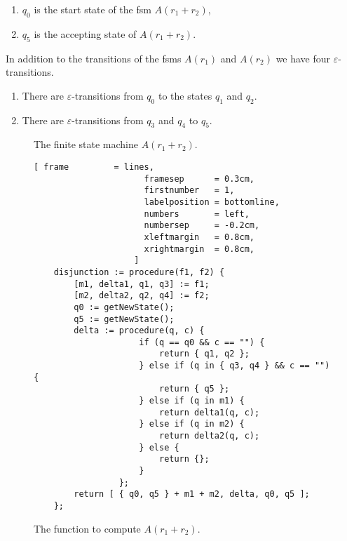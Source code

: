 \begin{enumerate}
\begin{enumerate}
      \item $q_0$ is the start state of the fsm $A(r_1 + r_2)$,
      \item $q_5$ is the accepting state of $A(r_1 + r_2)$.
      \end{enumerate}
      In addition to the transitions of the fsms  $A(r_1)$ and $A(r_2)$ we have four $\varepsilon$-transitions.
      \begin{enumerate}
      \item There are $\varepsilon$-transitions from $q_0$ to the states $q_1$ and $q_2$.
      \item There are $\varepsilon$-transitions from  $q_3$ and $q_4$ to $q_5$.
      \end{enumerate}
                   
      \begin{figure}[!ht]
        \centering
      \caption{The finite state machine $A(r_1 + r_2)$.}
      \label{fig:aPlus.eps}
      \end{figure}

    \begin{figure}[!ht]
    \centering
    \begin{Verbatim}[ frame         = lines, 
                      framesep      = 0.3cm, 
                      firstnumber   = 1,
                      labelposition = bottomline,
                      numbers       = left,
                      numbersep     = -0.2cm,
                      xleftmargin   = 0.8cm,
                      xrightmargin  = 0.8cm,
                    ]
    disjunction := procedure(f1, f2) {
        [m1, delta1, q1, q3] := f1;
        [m2, delta2, q2, q4] := f2;
        q0 := getNewState(); 
        q5 := getNewState(); 
        delta := procedure(q, c) {
                     if (q == q0 && c == "") {
                         return { q1, q2 };
                     } else if (q in { q3, q4 } && c == "") {
                         return { q5 };
                     } else if (q in m1) {
                         return delta1(q, c);
                     } else if (q in m2) {
                         return delta2(q, c);
                     } else {
                         return {};
                     } 
                 };
        return [ { q0, q5 } + m1 + m2, delta, q0, q5 ];
    };
    \end{Verbatim}
    \vspace*{-0.3cm}
    \caption{The function to compute $A(r_1 + r_2)$.}
    \label{fig:disjunction.stlx}
    \end{figure}
      

\end{enumerate}
